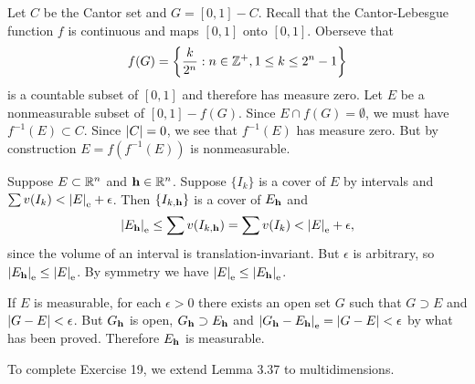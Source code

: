 \begin{exercise}{3.17}
  Let $C$ be the Cantor set and $G = [0, 1] - C$.
  Recall that the Cantor-Lebesgue function $f$ is continuous
  and maps $[0, 1]$ onto $[0, 1]$.
  Oberseve that
  \[
    f(G) = \left\{ \frac{k}{2^n} : n \in \mathbb{Z}^+, 1 \le k \le 2^n-1 \right\}
  \]
  is a countable subset of $[0, 1]$ and therefore has measure zero.
  Let $E$ be a nonmeasurable subset of $[0, 1] - f(G)$.
  Since $E \cap f(G) = \emptyset$,
  we must have $f^{-1}(E) \subset C$.
  Since $\left\vert C\right\vert = 0$,
  we see that $f^{-1}(E)$ has measure zero.
  But by construction $E = f (f^{-1}(E))$ is nonmeasurable.
\end{exercise}

\begin{exercise}{3.18}
  Suppose $E \subset \mathbb{R}^n$ and $\mathbf{h} \in \mathbb{R}^n$.
  Suppose $\{I_k\}$ is a cover of $E$ by intervals and
  $\sum v(I_k) < \left\vert E\right\vert_\mathrm{e} + \epsilon$.
  Then $\{I_{k, \mathbf{h}}\}$ is a cover of $E_{\mathbf{h}}$ and
  \[
    \left\vert E_{\mathbf{h}}\right\vert_\mathrm{e} \le \sum v(I_{k, \mathbf{h}}) = \sum v(I_k) < \left\vert E\right\vert_\mathrm{e} + \epsilon,
  \]
  since the volume of an interval is translation-invariant.
  But $\epsilon$ is arbitrary, so $\left\vert E_{\mathbf{h}}\right\vert_\mathrm{e} \le \left\vert E\right\vert_\mathrm{e}$.
  By symmetry we have $\left\vert E\right\vert_\mathrm{e} \le \left\vert E_{\mathbf{h}}\right\vert_\mathrm{e}$.

  If $E$ is measurable, for each $\epsilon > 0$
  there exists an open set $G$ such that $G \supset E$ and $\left\vert G-E\right\vert < \epsilon$.
  But $G_{\mathbf{h}}$ is open,
  $G_{\mathbf{h}} \supset E_{\mathbf{h}}$
  and $\left\vert G_{\mathbf{h}} - E_{\mathbf{h}}\right\vert_\mathrm{e} = \left\vert G - E\right\vert < \epsilon$
  by what has been proved.
  Therefore $E_{\mathbf{h}}$ is measurable.
\end{exercise}

To complete Exercise 19,
we extend Lemma 3.37 to multidimensions.

